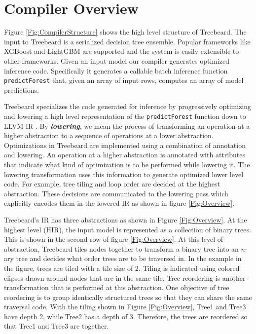\newcommand{\Treebeard}{{\sc {Treebeard}}}
\newcommand{\op}[1]{{\texttt {#1}}}

\section{Compiler Overview}
Figure \ref{Fig:CompilerStructure} shows the high level structure of Treebeard. 
The input to Treebeard is a serialized decision tree ensemble. Popular frameworks 
like XGBoost and LightGBM are supported and the system is easily extensible to other frameworks.
Given an input model our compiler generates optimized inference code. Specifically it generates a 
callable batch inference function \texttt{predictForest} that, given an array of input rows, computes an
array of model predictions. 
 
Treebeard specializes the code generated for inference by progressively optimizing and lowering a 
high level representation of the \texttt{predictForest} function down to LLVM IR \cite{LLVM}.
By \textbf{\emph{lowering}}, we mean the process of transforming an operation at a higher 
abstraction to a sequence of operations at a lower abstraction. Optimizations in Treebeard 
are implemented using a combination of annotation and lowering. An operation at a higher 
abstraction is annotated with attributes that indicate what kind of optimization is 
to be performed while lowering it. The lowering transformation uses this information to generate 
optimized lower level code. For example, tree tiling and loop order are decided 
at the highest abstraction. These decisions are communicated to the lowering pass 
which explicitly encodes them in the lowered IR as shown in figure \ref{Fig:Overview}.

Treebeard's IR has three abstractions as shown in Figure \ref{Fig:Overview}.  
At the highest level (HIR), the input model is represented as a collection of binary trees. This is shown 
in the second row of figure \ref{Fig:Overview}. At this level of abstraction,
Treebeard tiles nodes together to transform a binary tree into an $n$-ary tree 
and decides what order trees are to be traversed in. In the example in the figure, 
trees are tiled with a tile size of 2. Tiling is indicated using colored elipses drawn 
around nodes that are in the same tile. Tree reordering is another transformation that is performed at this abstraction. 
One objective of tree reordering is to group identically structured trees so that they can share the same traversal code. 
With the tiling shown in Figure \ref{Fig:Overview}, Tree1 and Tree3 have depth 2, while Tree2 has a depth of 3.
Therefore, the trees are reordered so that Tree1 and Tree3 are together. 


